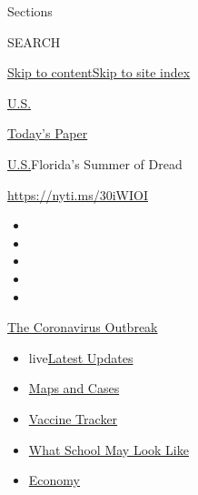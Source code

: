 Sections

SEARCH

\protect\hyperlink{site-content}{Skip to
content}\protect\hyperlink{site-index}{Skip to site index}

\href{https://www.nytimes3xbfgragh.onion/section/us}{U.S.}

\href{https://myaccount.nytimes3xbfgragh.onion/auth/login?response_type=cookie\&client_id=vi}{}

\href{https://www.nytimes3xbfgragh.onion/section/todayspaper}{Today's
Paper}

\href{/section/us}{U.S.}\textbar{}Florida's Summer of Dread

\url{https://nyti.ms/30iWIOI}

\begin{itemize}
\item
\item
\item
\item
\item
\end{itemize}

\href{https://www.nytimes3xbfgragh.onion/news-event/coronavirus?action=click\&pgtype=Article\&state=default\&region=TOP_BANNER\&context=storylines_menu}{The
Coronavirus Outbreak}

\begin{itemize}
\tightlist
\item
  live\href{https://www.nytimes3xbfgragh.onion/2020/08/02/world/coronavirus-updates.html?action=click\&pgtype=Article\&state=default\&region=TOP_BANNER\&context=storylines_menu}{Latest
  Updates}
\item
  \href{https://www.nytimes3xbfgragh.onion/interactive/2020/us/coronavirus-us-cases.html?action=click\&pgtype=Article\&state=default\&region=TOP_BANNER\&context=storylines_menu}{Maps
  and Cases}
\item
  \href{https://www.nytimes3xbfgragh.onion/interactive/2020/science/coronavirus-vaccine-tracker.html?action=click\&pgtype=Article\&state=default\&region=TOP_BANNER\&context=storylines_menu}{Vaccine
  Tracker}
\item
  \href{https://www.nytimes3xbfgragh.onion/interactive/2020/07/29/us/schools-reopening-coronavirus.html?action=click\&pgtype=Article\&state=default\&region=TOP_BANNER\&context=storylines_menu}{What
  School May Look Like}
\item
  \href{https://www.nytimes3xbfgragh.onion/live/2020/07/31/business/stock-market-today-coronavirus?action=click\&pgtype=Article\&state=default\&region=TOP_BANNER\&context=storylines_menu}{Economy}
\end{itemize}

